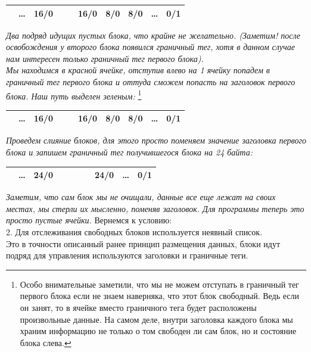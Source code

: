 \documentclass[12pt, letterpaper]{article}
\begin{document}
\begin{center}
    \begin{tabular}{|c|c|c|c|c|c|c|c|c|c|}
        \hline
          & \dots & 16/0 & & & 16/0 &\cellcolor{red!=40} 8/0 & 8/0 & \dots & 0/1\\
        \hline
    \end{tabular}
\end{center}
\textit{Два подряд идущих пустых блока, что крайне не желательно. (Заметим! после освобождения у второго блока появился граничный тег, хотя в данном случае нам интересен только граничный тег первого блока).\\ Мы находимся в красной ячейке, отступив влево на 1 ячейку попадем в граничный тег первого блока и оттуда сможем попасть на заголовок первого блока. Наш путь выделен зеленым:} \footnote{Особо внимательные заметили, что мы не можем отступать в граничный тег первого блока если не знаем наверняка, что этот блок свободный. Ведь если он занят, то в ячейке вместо граничного тега будет расположены произвольные данные. На самом деле, внутри заголовка каждого блока мы храним информацию не только о том свободен ли сам блок, но и состояние блока слева.} 

\begin{center}
    \begin{tabular}{|c|c|c|c|c|c|c|c|c|c|}
        \hline
          & \dots & \cellcolor{green!=40} 16/0 & & & \cellcolor{green!=40} 16/0 &\cellcolor{green!=40} 8/0 & 8/0 & \dots & 0/1\\
        \hline
    \end{tabular}
\end{center}
\textit{Проведем слияние блоков, для этого просто поменяем значение заголовка первого блока и запишем граничный тег получившегося блока на 24 байта:}
\begin{center}
    \begin{tabular}{|c|c|c|c|c|c|c|c|c|c|}
        \hline
          & \dots & 24/0 & & & & & 24/0 & \dots & 0/1\\
        \hline
    \end{tabular}
\end{center}
\textit{Заметим, что сам блок мы не очищали, данные все еще лежат на своих местах, мы стерли их мысленно, поменяв заголовок. Для программы теперь это просто пустые ячейки.}
\newline
\newline
Вернемся к условию:\\

2. Для отслеживания свободных блоков используется неявный список.\\
Это в точности описанный ранее принцип размещения данных, блоки идут подряд для управления используются заголовки и граничные теги.\\
\end{document}
